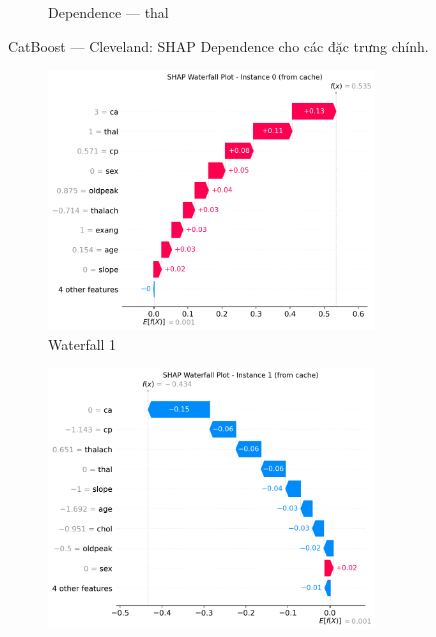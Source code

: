 \begin{figure}[H]
\begin{subfigure}[b]{0.31\textwidth}
\caption{Dependence — thal}
\label{fig:cat_clev_dep_thal}
\end{subfigure}
\caption{CatBoost — Cleveland: SHAP Dependence cho các đặc trưng chính.}
\label{fig:cat_clev_dependences}
\end{figure}

\begin{figure}[H]
\centering
\begin{subfigure}[b]{0.31\textwidth}
\centering
\includegraphics[width=0.95\textwidth]{Result/cleveland_dataset/Catboost/SHAP/Waterfall 1.png}
\caption{Waterfall 1}
\label{fig:cat_clev_waterfall1}
\end{subfigure}\hfill
\begin{subfigure}[b]{0.31\textwidth}
\centering
\includegraphics[width=0.95\textwidth]{Result/cleveland_dataset/Catboost/SHAP/Waterfall 2.png}

\end{subfigure}
\end{figure}
